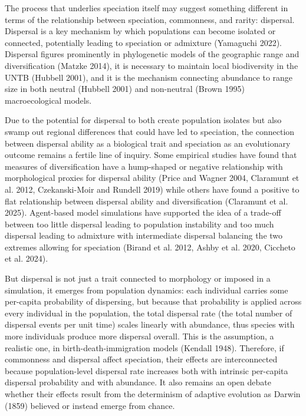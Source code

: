 \documentclass[
  letterpaper,
  DIV=11,
  numbers=noendperiod]{scrartcl}
\begin{document}
The process that underlies speciation itself may suggest something
different in terms of the relationship between speciation, commonness,
and rarity: dispersal. Dispersal is a key mechanism by which populations
can become isolated or connected, potentially leading to speciation or
admixture (Yamaguchi 2022). Dispersal figures prominently in
phylogenetic models of the geographic range and diversification (Matzke
2014), it is necessary to maintain local biodiversity in the UNTB
(Hubbell 2001), and it is the mechanism connecting abundance to range
size in both neutral (Hubbell 2001) and non-neutral (Brown 1995)
macroecological models.

Due to the potential for dispersal to both create population isolates
but also swamp out regional differences that could have led to
speciation, the connection between dispersal ability as a biological
trait and speciation as an evolutionary outcome remains a fertile line
of inquiry. Some empirical studies have found that measures of
diversification have a hump-shaped or negative relationship with
morphological proxies for dispersal ability (Price and Wagner 2004,
Claramunt et al. 2012, Czekanski-Moir and Rundell 2019) while others
have found a positive to flat relationship between dispersal ability and
diversification (Claramunt et al. 2025). Agent-based model simulations
have supported the idea of a trade-off between too little dispersal
leading to population instability and too much dispersal leading to
admixture with intermediate dispersal balancing the two extremes
allowing for speciation (Birand et al. 2012, Ashby et al. 2020, Ciccheto
et al. 2024).

But dispersal is not just a trait connected to morphology or imposed in
a simulation, it emerges from population dynamics: each individual
carries some per-capita probability of dispersing, but because that
probability is applied across every individual in the population, the
total dispersal rate (the total number of dispersal events per unit
time) scales linearly with abundance, thus species with more individuals
produce more dispersal overall. This is the assumption, a realistic one,
in birth-death-immigration models (Kendall 1948). Therefore, if
commonness and dispersal affect speciation, their effects are
interconnected because population-level dispersal rate increases both
with intrinsic per-capita dispersal probability and with abundance. It
also remains an open debate whether their effects result from the
determinism of adaptive evolution as Darwin (1859) believed or instead
emerge from chance.
\end{document}
